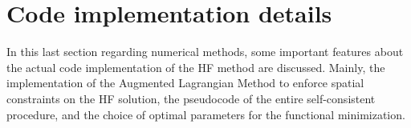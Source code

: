 \section{Code implementation details}
\label{sec:minimization}
In this last section regarding numerical methods, some important features about the actual code implementation of the HF method are discussed.
Mainly, the implementation of the Augmented Lagrangian Method to enforce spatial constraints on the HF solution, the pseudocode of the entire self-consistent procedure, and the choice of optimal parameters for the functional minimization.



